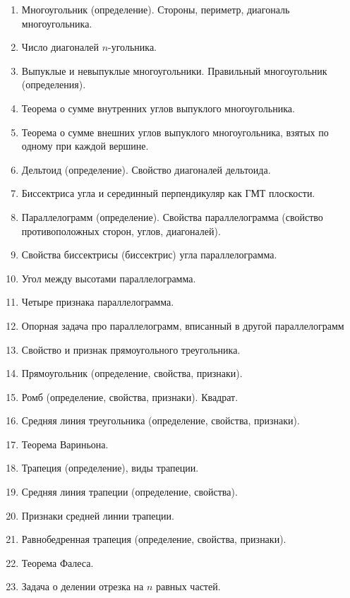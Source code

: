 \fontsize{16}{20}\selectfont
\begin{enumerate}[label=\arabic*)]
    \item Многоугольник (определение).
    Стороны, периметр, диагональ многоугольника.
    \item Число диагоналей $n$-угольника.
    \item Выпуклые и невыпуклые многоугольники.
    Правильный многоугольник (определения).
    \item Теорема о сумме внутренних углов выпуклого многоугольника.
    \item Теорема о сумме внешних углов выпуклого многоугольника,
    взятых по одному при каждой вершине.
    \item Дельтоид (определение).
    Свойство диагоналей дельтоида.
    \item Биссектриса угла и серединный перпендикуляр как ГМТ плоскости.
    \item Параллелограмм (определение).
    Свойства параллелограмма (свойство противоположных сторон, углов, диагоналей).
    \item Свойства биссектрисы (биссектрис) угла параллелограмма.
    \item Угол между высотами параллелограмма.
    \item Четыре признака параллелограмма.
    \item Опорная задача про параллелограмм, вписанный в другой параллелограмм
    \item Свойство и признак прямоугольного треугольника.
    \item Прямоугольник (определение, свойства, признаки).
    \item Ромб (определение, свойства, признаки). Квадрат.
    \item Средняя линия треугольника (определение, свойства, признаки).
    \item Теорема Вариньона.
    \item Трапеция (определение), виды трапеции.
    \item Средняя линия трапеции (определение, свойства).
    \item Признаки средней линии трапеции.
    \item Равнобедренная трапеция (определение, свойства, признаки).
    \item Теорема Фалеса.
    \item Задача о делении отрезка на $n$ равных частей.
\end{enumerate}